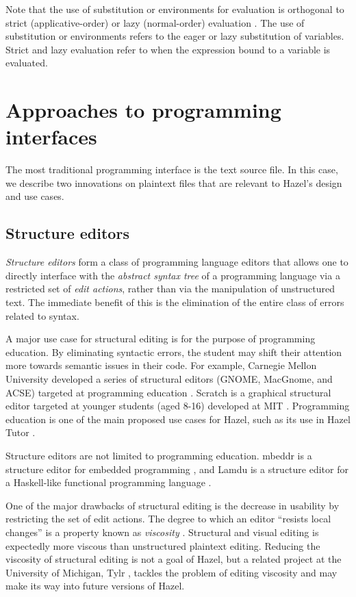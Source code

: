 Note that the use of substitution or environments for evaluation is orthogonal to strict (applicative-order) or lazy (normal-order) evaluation \cite{plotkin1975call}. The use of substitution or environments refers to the eager or lazy substitution of variables. Strict and lazy evaluation refer to when the expression bound to a variable is evaluated.

\section{Approaches to programming interfaces}
\label{sec:prog-intf}

The most traditional programming interface is the text source file. In this case, we describe two innovations on plaintext files that are relevant to Hazel's design and use cases.

\subsection{Structure editors}
\label{sec:structure-editors}

\textit{Structure editors} form a class of programming language editors that allows one to directly interface with the \textit{abstract syntax tree} of a programming language via a restricted set of \textit{edit actions}, rather than via the manipulation of unstructured text. The immediate benefit of this is the elimination of the entire class of errors related to syntax.

A major use case for structural editing is for the purpose of programming education. By eliminating syntactic errors, the student may shift their attention more towards semantic issues in their code. For example, Carnegie Mellon University developed a series of structural editors (GNOME, MacGnome, and ACSE)  targeted at programming education \cite{miller1994evolution}. Scratch is a graphical structural editor targeted at younger students (aged 8-16) developed at MIT \cite{maloney2010scratch}. Programming education is one of the main proposed use cases for Hazel, such as its use in Hazel Tutor \cite{potter2020hazel}.

Structure editors are not limited to programming education. mbeddr is a structure editor for embedded programming \cite{voelter2012mbeddr}, and Lamdu is a structure editor for a Haskell-like functional programming language \cite{lotem_chuchem}.

One of the major drawbacks of structural editing is the decrease in usability by restricting the set of edit actions. The degree to which an editor ``resists local changes'' is a property known as \textit{viscosity} \cite{green1989cognitive}. Structural and visual editing is expectedly more viscous than unstructured plaintext editing. Reducing the viscosity of structural editing is not a goal of Hazel, but a related project at the University of Michigan, Tylr \cite{tylr_git}, tackles the problem of editing viscosity and may make its way into future versions of Hazel.

